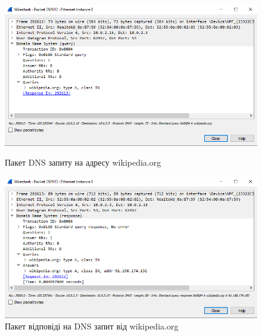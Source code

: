 \documentclass{article}
\begin{document}
\begin{normalsize}
\begin{figure}[H]
	\centering
	\begin{minipage}[t]{0.49\textwidth}
		\includegraphics[width=\textwidth]{21}
		\caption{Пакет DNS запиту на адресу wikipedia.org}
	\end{minipage}
	\hfill
	\begin{minipage}[t]{0.49\textwidth}
		\includegraphics[width=\textwidth]{22}
		\caption{Пакет відповіді на DNS запит від wikipedia.org}
	\end{minipage}
\end{figure}


\end{normalsize}
\end{document}
